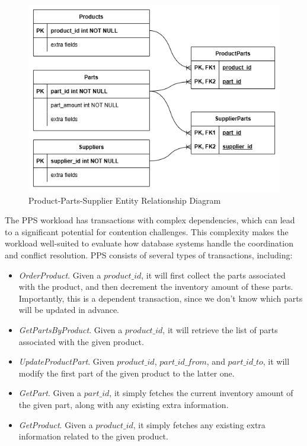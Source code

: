 \begin{figure}[h]
    \centering
    \includegraphics[width=1\linewidth]{figures/PPS ERD.png}
    \caption{Product-Parts-Supplier Entity Relationship Diagram}
    \label{fig: pps-erd}
\end{figure}

The PPS workload has transactions with complex dependencies, which can lead to a significant potential for contention challenges. This complexity makes the workload well-suited to evaluate how database systems handle the coordination and conflict resolution. PPS consists of several types of transactions, including:
\begin{itemize}
    \item \textit{OrderProduct}. Given a $product\_id$, it will first collect the parts associated with the product, and then decrement the inventory amount of these parts. Importantly, this is a dependent transaction, since we don't know which parts will be updated in advance.
    \item \textit{GetPartsByProduct}. Given a $product\_id$, it will retrieve the list of parts associated with the given product.
    \item \textit{UpdateProductPart}. Given $product\_id$, $part\_id\_from$, and $part\_id\_to$, it will modify the first part of the given product to the latter one.
    \item \textit{GetPart}. Given a $part\_id$, it simply fetches the current inventory amount of the given part, along with any existing extra information.
    \item \textit{GetProduct}. Given a $product\_id$, it simply fetches any existing extra information related to the given product.
\end{itemize}